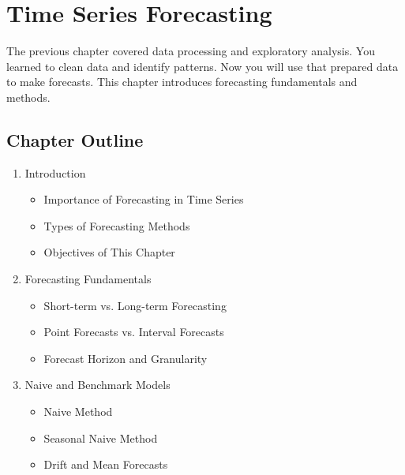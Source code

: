 \chapter{Time Series Forecasting}

The previous chapter covered data processing and exploratory analysis. You learned to clean data and identify patterns. Now you will use that prepared data to make forecasts. This chapter introduces forecasting fundamentals and methods.

\section*{Chapter Outline}

\begin{enumerate}

\item Introduction

\begin{itemize}

\item Importance of Forecasting in Time Series

\item Types of Forecasting Methods

\item Objectives of This Chapter

\end{itemize}

\item Forecasting Fundamentals

\begin{itemize}

\item Short-term vs. Long-term Forecasting

\item Point Forecasts vs. Interval Forecasts

\item Forecast Horizon and Granularity

\end{itemize}

\item Naive and Benchmark Models

\begin{itemize}

\item Naive Method

\item Seasonal Naive Method

\item Drift and Mean Forecasts


\end{itemize}
\end{enumerate}
